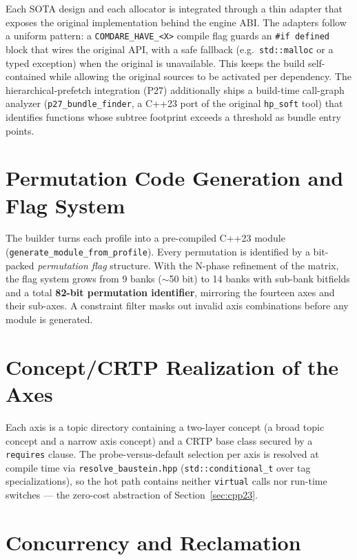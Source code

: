 Each SOTA design and each allocator is integrated through a thin adapter that exposes the
original implementation behind the engine ABI. The adapters follow a uniform pattern: a
\texttt{COMDARE\_HAVE\_<X>} compile flag guards an \texttt{\#if defined} block that wires
the original API, with a safe fallback (e.g.\ \texttt{std::malloc} or a typed exception)
when the original is unavailable. This keeps the build self-contained while allowing the
original sources to be activated per dependency. The hierarchical-prefetch integration
(P27) additionally ships a build-time call-graph analyzer (\texttt{p27\_bundle\_finder}, a
C++23 port of the original \texttt{hp\_soft} tool) that identifies functions whose subtree
footprint exceeds a threshold as bundle entry points.

\section{Permutation Code Generation and Flag System}\label{sec:codegen}

The builder turns each profile into a pre-compiled C++23 module
(\texttt{generate\_module\_from\_profile}). Every permutation is identified by a
bit-packed \emph{permutation flag} structure. With the N-phase refinement of the matrix,
the flag system grows from 9 banks ($\sim$50 bit) to 14 banks with sub-bank bitfields and
a total \textbf{82-bit permutation identifier}, mirroring the fourteen axes and their
sub-axes. A constraint filter masks out invalid axis combinations before any module is
generated.

\section{Concept/CRTP Realization of the Axes}\label{sec:concept-crtp}

Each axis is a topic directory containing a two-layer concept (a broad topic concept and a
narrow axis concept) and a CRTP base class secured by a \texttt{requires} clause. The
probe-versus-default selection per axis is resolved at compile time via
\texttt{resolve\_baustein.hpp} (\texttt{std::conditional\_t} over tag specializations), so
the hot path contains neither \texttt{virtual} calls nor run-time switches --- the
zero-cost abstraction of Section~\ref{sec:cpp23}.

\section{Concurrency and Reclamation}\label{sec:concurrency}

